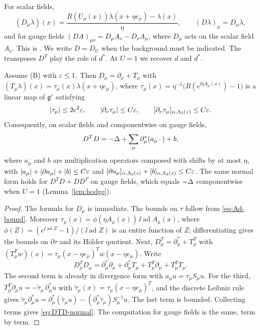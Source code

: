 For scalar fields,
\[
(D_\mu\lambda)(x)=\frac{R(U_\mu(x))\lambda(x+\eta e_\mu)-\lambda(x)}\eta,\qquad (D\lambda)_\mu=D_\mu\lambda,
\]
and for gauge fields $(DA)_{\mu\nu}=D_\mu A_\nu-D_\nu A_\mu$, where $D_\mu$ acts on the scalar field $A_\nu$. This is \cite[(3.3), (3.4)]{BalBackground}. We write $D=D_U$ when the background must be indicated. The transposes $D^T$ play the role of $d^*$. At $U=1$ we recover $d$ and $d^*$.

\begin{lemma}\label{lem:cov-expansion}
Assume (B) with $\varepsilon\le1$. Then $D_\mu=\partial_\mu+T_\mu$ with $(T_\mu\lambda)(x)=\tau_\mu(x)\lambda(x+\eta e_\mu)$, where $\tau_\mu(x)=\eta^{-1}\big(R(e^{\ii\eta A_\mu(x)})-1\big)$ is a linear map of $\mathfrak g^c$ satisfying
\[
|\tau_\mu|\le 2e^2\varepsilon,\qquad|\partial_\nu\tau_\mu|\le C\varepsilon,\qquad[\partial_\nu\tau_\mu]_{\alpha,\Lambda_3(z)}\le C\varepsilon .
\]
Consequently, on scalar fields and componentwise on gauge fields,
\begin{equation}\label{eq:DTD-normal}
D^TD=-\Delta+\sum_\mu\partial^*_\mu(a_\mu\,\cdot\,)+b,
\end{equation}
where $a_\mu$ and $b$ are multiplication operators composed with shifts by at most $\eta$, with $|a_\mu|+|\partial a_\mu|+|b|\le C\varepsilon$ and $[\partial a_\mu]_{\alpha,\Lambda_3(z)}+[b]_{\alpha,\Lambda_3(z)}\le C\varepsilon$. The same normal form holds for $D^TD+DD^T$ on gauge fields, which equals $-\Delta$ componentwise when $U=1$ (Lemma~\ref{lem:hodge}).
\end{lemma}

\begin{proof}
The formula for $D_\mu$ is immediate. The bounds on $\tau$ follow from \eqref{eq:Ad-bound}. Moreover $\tau_\mu(x)=\phi(\eta A_\mu(x))\,\ii\operatorname{ad}A_\mu(x)$, where $\phi(Z)=(e^{\ii\operatorname{ad}Z}-1)/(\ii\operatorname{ad}Z)$ is an entire function of $Z$; differentiating gives the bounds on $\partial\tau$ and its H\"older quotient. Next, $D^T_\mu=\partial^*_\mu+T^T_\mu$ with $(T^T_\mu w)(x)=\tau_\mu(x-\eta e_\mu)^Tw(x-\eta e_\mu)$. Write
\[
D^T_\mu D_\mu=\partial^*_\mu\partial_\mu+\partial^*_\mu T_\mu+T_\mu^T\partial_\mu+T^T_\mu T_\mu .
\]
The second term is already in divergence form with $a_\mu u=\tau_\mu S_\mu u$. For the third, $T^T_\mu\partial_\mu u=-\tilde\tau_\mu\,\partial^*_\mu u$ with $\tilde\tau_\mu(x)=\tau_\mu(x-\eta e_\mu)^T$, and the discrete Leibniz rule gives $\tilde\tau_\mu\partial^*_\mu u=\partial^*_\mu(\tilde\tau_\mu u)-(\partial^*_\mu\tilde\tau_\mu)S_\mu^{-1}u$. The last term is bounded. Collecting terms gives \eqref{eq:DTD-normal}. The computation for gauge fields is the same, term by term.
\end{proof}

